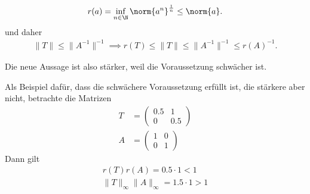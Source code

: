 \begin{solution}
\begin{align*}
  r(a)
  =
  \inf_{n \in \N}
  \norm{a^n}^\frac{1}{n}
  \leq
  \norm{a}.
\end{align*}
und daher
\begin{align*}
  \|T\| \leq \|A^{-1}\|^{-1} \implies r(T) \leq \|T\| \leq \|A^{-1}\|^{-1} \leq r(A)^{-1}.
\end{align*}

Die neue Aussage ist also stärker, weil die Voraussetzung schwächer ist.

Als Beispiel dafür, dass die schwächere Voraussetzung erfüllt ist, die stärkere aber nicht,
betrachte die Matrizen
\begin{align*}
  T &= \begin{pmatrix}
    0.5 & 1 \\ 0 & 0.5
  \end{pmatrix} \\
  A &= \begin{pmatrix}
    1 & 0 \\ 0 & 1
  \end{pmatrix}
\end{align*}
Dann gilt
\begin{align*}
  r(T)r(A) = 0.5\cdot1 < 1 \\
  \|T\|_{\infty}\|A\|_{\infty} = 1.5\cdot1 > 1
\end{align*}
\end{solution}
